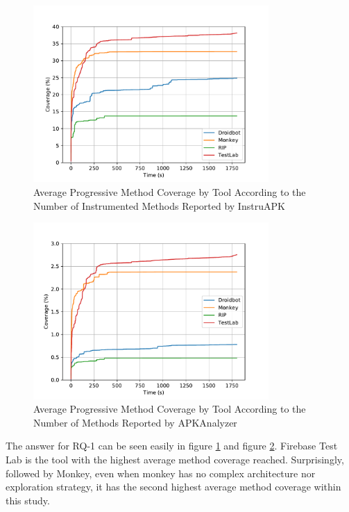 \begin{figure}[h]
\centering
\includegraphics[width=0.8\textwidth]{../Figures/averageCoverageInstruAPK.pdf}
\caption{Average Progressive Method Coverage by Tool According to the Number of Instrumented Methods Reported by InstruAPK}\label{fig:averageCoverageInstruAPK}
\end{figure}

\begin{figure}[h]
\centering
\includegraphics[width=0.8\textwidth]{../Figures/averageCoverageAPKAnalyzer.pdf}
\caption{Average Progressive Method Coverage by Tool According to the Number of Methods Reported by APKAnalyzer}\label{fig:averageCoverageAPKAnalyzer}
\end{figure}


The answer for RQ-1 can be seen easily in figure \ref{fig:averageCoverageInstruAPK} and figure \ref{fig:averageCoverageAPKAnalyzer}. Firebase Test Lab is the tool with the highest average method coverage reached. Surprisingly, followed by Monkey, even when monkey has no complex architecture nor exploration strategy, it has the second highest average method coverage within this study.


